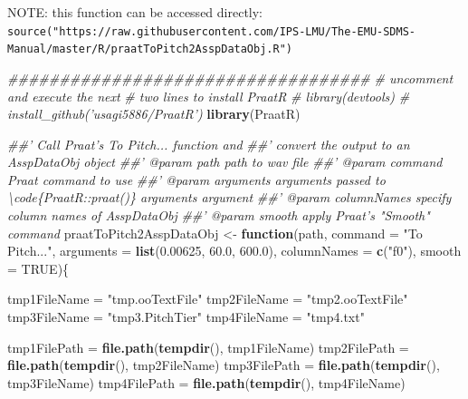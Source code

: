 \documentclass[]{book}
\newenvironment{Shaded}{\begin{snugshade}}{\end{snugshade}}
\newcommand{\CommentTok}[1]{\textcolor[rgb]{0.56,0.35,0.01}{\textit{#1}}}
\newcommand{\ControlFlowTok}[1]{\textcolor[rgb]{0.13,0.29,0.53}{\textbf{#1}}}
\newcommand{\DataTypeTok}[1]{\textcolor[rgb]{0.13,0.29,0.53}{#1}}
\newcommand{\FloatTok}[1]{\textcolor[rgb]{0.00,0.00,0.81}{#1}}
\newcommand{\KeywordTok}[1]{\textcolor[rgb]{0.13,0.29,0.53}{\textbf{#1}}}
\newcommand{\NormalTok}[1]{#1}
\newcommand{\OtherTok}[1]{\textcolor[rgb]{0.56,0.35,0.01}{#1}}
\newcommand{\StringTok}[1]{\textcolor[rgb]{0.31,0.60,0.02}{#1}}
\begin{document}
NOTE: this function can be accessed directly: \texttt{source("https://raw.githubusercontent.com/IPS-LMU/The-EMU-SDMS-Manual/master/R/praatToPitch2AsspDataObj.R")}

\begin{Shaded}
\begin{Highlighting}[]
\CommentTok{###################################}
\CommentTok{# uncomment and execute the next}
\CommentTok{# two lines to install PraatR}
\CommentTok{# library(devtools)}
\CommentTok{# install_github('usagi5886/PraatR')}
\KeywordTok{library}\NormalTok{(PraatR)}

\CommentTok{##' Call Praat's To Pitch... function and}
\CommentTok{##' convert the output to an AsspDataObj object}
\CommentTok{##' @param path path to wav file}
\CommentTok{##' @param command Praat command to use}
\CommentTok{##' @param arguments arguments passed to \textbackslash{}code\{PraatR::praat()\} arguments argument}
\CommentTok{##' @param columnNames specify column names of AsspDataObj}
\CommentTok{##' @param smooth apply Praat's "Smooth" command}
\NormalTok{praatToPitch2AsspDataObj <-}\StringTok{ }\ControlFlowTok{function}\NormalTok{(path,}
                                     \DataTypeTok{command =} \StringTok{"To Pitch..."}\NormalTok{,}
                                     \DataTypeTok{arguments =} \KeywordTok{list}\NormalTok{(}\FloatTok{0.00625}\NormalTok{,}
                                                      \FloatTok{60.0}\NormalTok{,}
                                                      \FloatTok{600.0}\NormalTok{),}
                                     \DataTypeTok{columnNames =} \KeywordTok{c}\NormalTok{(}\StringTok{"f0"}\NormalTok{),}
                                     \DataTypeTok{smooth =} \OtherTok{TRUE}\NormalTok{)\{}

\NormalTok{  tmp1FileName =}\StringTok{ "tmp.ooTextFile"}
\NormalTok{  tmp2FileName =}\StringTok{ "tmp2.ooTextFile"}
\NormalTok{  tmp3FileName =}\StringTok{ "tmp3.PitchTier"}
\NormalTok{  tmp4FileName =}\StringTok{ "tmp4.txt"}

\NormalTok{  tmp1FilePath =}\StringTok{ }\KeywordTok{file.path}\NormalTok{(}\KeywordTok{tempdir}\NormalTok{(), tmp1FileName)}
\NormalTok{  tmp2FilePath =}\StringTok{ }\KeywordTok{file.path}\NormalTok{(}\KeywordTok{tempdir}\NormalTok{(), tmp2FileName)}
\NormalTok{  tmp3FilePath =}\StringTok{ }\KeywordTok{file.path}\NormalTok{(}\KeywordTok{tempdir}\NormalTok{(), tmp3FileName)}
\NormalTok{  tmp4FilePath =}\StringTok{ }\KeywordTok{file.path}\NormalTok{(}\KeywordTok{tempdir}\NormalTok{(), tmp4FileName)}


\end{Highlighting}
\end{Shaded}
\end{document}
